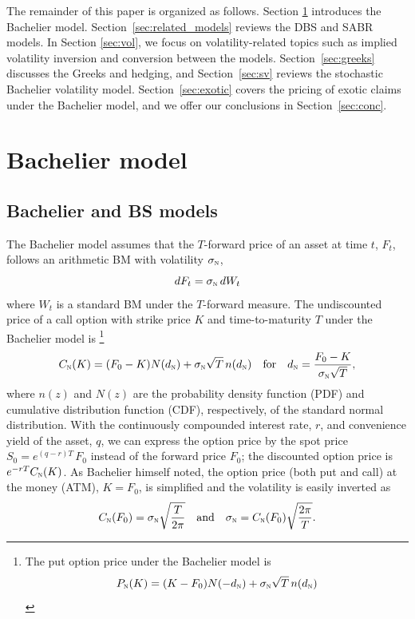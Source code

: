 \documentclass[a4paper,review]{elsarticle}
\newcommand{\qtext}[2][\quad]{#1\text{#2}#1}
\newcommand{\sigman}{\sigma_\textsc{n}}
\newcommand{\norm}{\textsc{n}}
\begin{document}
The remainder of this paper is organized as follows. Section \ref{sec:model} introduces the Bachelier model. Section~\ref{sec:related_models} reviews the DBS and SABR models. In Section \ref{sec:vol}, we focus on volatility-related topics such as implied volatility inversion and conversion between the models. Section~\ref{sec:greeks} discusses the Greeks and hedging, and Section~\ref{sec:sv} reviews the stochastic Bachelier volatility model. Section~\ref{sec:exotic} covers the pricing of exotic claims under the Bachelier model, and we offer our conclusions in Section~\ref{sec:conc}.

\section{Bachelier model} \label{sec:model} \noindent
\subsection{Bachelier and BS models} \noindent
The Bachelier model assumes that the $T$-forward price of an asset at time $t$, $F_t$, follows an arithmetic BM with volatility $\sigman$,
$$ dF_t = \sigman \, dW_t %
$$
where $W_t$ is a standard BM under the $T$-forward measure. The undiscounted price of a call option with strike price $K$ and time-to-maturity $T$ under the Bachelier model is \footnote{The put option price under the Bachelier model is
$$ P_\norm(K) = (K - F_0) N(-d_\norm) + \sigman\sqrt{T} \, n(d_\norm)
$$}
\begin{equation} \label{eq:bach}
C_\norm(K) = (F_0 - K) N(d_\norm) + \sigman\sqrt{T} \, n(d_\norm)
\qtext{for} d_\norm = \frac{F_0 - K}{\sigman \sqrt{T}},
\end{equation}
where $n(z)$ and $N(z)$ are the probability density function (PDF) and cumulative distribution function (CDF), respectively, of the standard normal distribution. With the continuously compounded interest rate, $r$, and convenience yield of the asset, $q$, we can express the option price by the spot price $S_0 = e^{(q-r)T}\,F_0$ instead of the forward price $F_0$; the discounted option price is $e^{-rT} C_\norm(K)$. As Bachelier himself noted, the option price (both put and call) at the money (ATM), $K=F_0$, is simplified and the volatility is easily inverted as~\citep[\S 2.1]{schachermayer2008close}
\begin{equation} \label{eq:atm}
	C_\norm(F_0) = \sigman \sqrt{\frac{T}{2\pi}} \qtext{and} \sigman = C_\norm(F_0) \sqrt{\frac{2\pi}{T}}.
\end{equation}
\end{document}
